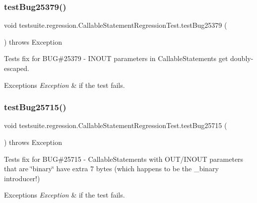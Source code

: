 \subsubsection{\texorpdfstring{test\+Bug25379()}{testBug25379()}}
{\footnotesize\ttfamily void testsuite.\+regression.\+Callable\+Statement\+Regression\+Test.\+test\+Bug25379 (\begin{DoxyParamCaption}{ }\end{DoxyParamCaption}) throws Exception}

Tests fix for B\+UG\#25379 -\/ I\+N\+O\+UT parameters in Callable\+Statements get doubly-\/escaped.


\begin{DoxyExceptions}{Exceptions}
{\em Exception} & if the test fails. \\
\hline
\end{DoxyExceptions}
\mbox{\label{classtestsuite_1_1regression_1_1_callable_statement_regression_test_af26c483761c1cc584287d8a35c4f82db}} 
\subsubsection{\texorpdfstring{test\+Bug25715()}{testBug25715()}}
{\footnotesize\ttfamily void testsuite.\+regression.\+Callable\+Statement\+Regression\+Test.\+test\+Bug25715 (\begin{DoxyParamCaption}{ }\end{DoxyParamCaption}) throws Exception}

Tests fix for B\+UG\#25715 -\/ Callable\+Statements with O\+U\+T/\+I\+N\+O\+UT parameters that are \char`\"{}binary\char`\"{} have extra 7 bytes (which happens to be the \+\_\+binary introducer!)


\begin{DoxyExceptions}{Exceptions}
{\em Exception} & if the test fails. \\
\hline
\end{DoxyExceptions}
\mbox{\label{classtestsuite_1_1regression_1_1_callable_statement_regression_test_a5184b94848dc877dcda10b8a55c6979f}} 
